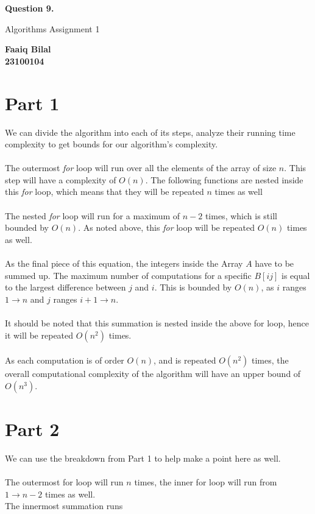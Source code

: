 \documentclass[]{article}
\begin{document}
\begin{center}
    \vspace*{1cm}

    \textbf{Question 9.}

    \vspace{0.5cm}
     Algorithms Assignment 1

    \vspace{0.15cm}

    \textbf{Faaiq Bilal} \\ 
    \textbf{23100104}
         
\end{center}

\section{Part 1}
We can divide the algorithm into each of its steps, analyze their running time complexity to get bounds for our algorithm's complexity. \\ \\
The outermost \emph{for} loop will run over all the elements of the array of size $n$. This step will have a complexity of $O(n)$. The following functions are nested inside this \emph{for} loop, which means that they will be repeated $n$ times as well \\ \\
The nested \emph{for} loop will run for a maximum of $n-2$ times, which is still bounded by $O(n)$. As noted above, this \emph{for} loop will be repeated $O(n)$ times as well. \\ \\
As the final piece of this equation, the integers inside the Array $A$ have to be summed up. The maximum number of computations for a specific $B[ij]$ is equal to the largest difference between $j$ and $i$. This is bounded by $O(n)$, as $i$ ranges $1 \rightarrow n$ and $j$ ranges $i+1 \rightarrow n$.\\ \\
It should be noted that this summation is nested inside the above for loop, hence it will be repeated $O(n^2)$ times. \\ \\
As each computation is of order $O(n)$, and is repeated $O(n^2)$ times, the overall computational complexity of the algorithm will have an upper bound of $O(n^3)$. 

\section{Part 2}
We can use the breakdown from Part 1 to help make a point here as well. \\ \\
The outermost for loop will run $n$ times, the inner for loop will run from $1 \rightarrow n-2$ times as well. \\
The innermost summation runs 
\end{document}
